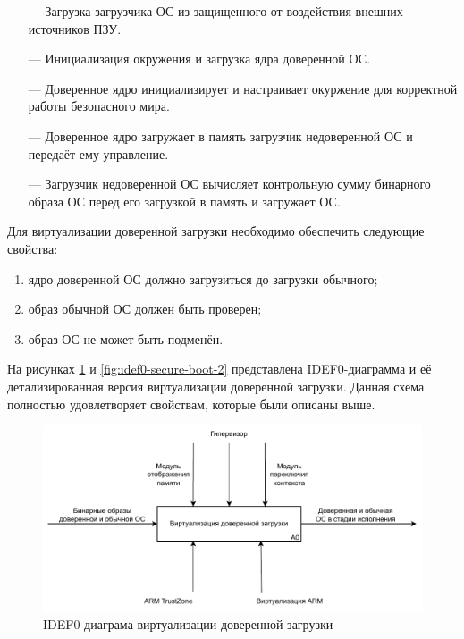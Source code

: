\begin{itemize}
	\item [---] Загрузка загрузчика ОС из защищенного от воздействия внешних источников ПЗУ.
	\item [---] Инициализация окружения и загрузка ядра доверенной ОС.
	\item [---] Доверенное ядро инициализирует и настраивает окуржение для корректной работы безопасного мира.
	\item [---] Доверенное ядро загружает в память загрузчик недоверенной ОС и передаёт ему управление.
	\item [---] Загрузчик недоверенной ОС вычисляет контрольную сумму бинарного образа ОС перед его загрузкой в память и загружает ОС.
\end{itemize}

Для виртуализации доверенной загрузки необходимо обеспечить следующие свойства:

\begin{enumerate}
	\item ядро доверенной ОС должно загрузиться до загрузки обычного;
	\item образ обычной ОС должен быть проверен;
	\item образ ОС не может быть подменён.
\end{enumerate}

На рисунках \ref{fig:idef0-secure-boot-1} и \ref{fig:idef0-secure-boot-2} представлена IDEF0-диаграмма и её детализированная версия виртуализации доверенной загрузки. Данная схема полностью удовлетворяет свойствам, которые были описаны выше.

\begin{figure}[h]
	\centering
	\includegraphics[width=\textwidth]{img/idef0-secure-boot-1.pdf}
	\caption{IDEF0-диаграма виртуализации доверенной загрузки}
	\label{fig:idef0-secure-boot-1}
\end{figure}

